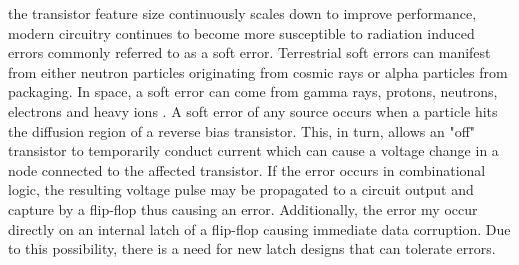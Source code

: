 
% 
 the transistor feature size continuously scales down to improve performance, modern circuitry continues to become more susceptible to radiation induced errors commonly referred to as a soft error. Terrestrial soft errors can manifest from either neutron particles originating from cosmic rays or alpha particles from packaging. In space, a soft error can come from gamma rays, protons, neutrons, electrons and heavy ions \cite{Zick2008}. A soft error of any source occurs when a particle hits the diffusion region of a reverse bias transistor. This, in turn, allows an "off" transistor to temporarily conduct current which can cause a voltage change in a node connected to the affected transistor. If the error occurs in combinational logic, the resulting voltage pulse may be propagated to a circuit output and capture by a flip-flop thus causing an error. Additionally, the error my occur directly on an internal latch of a flip-flop causing immediate data corruption. Due to this possibility, there is a need for new latch designs that can tolerate errors.

